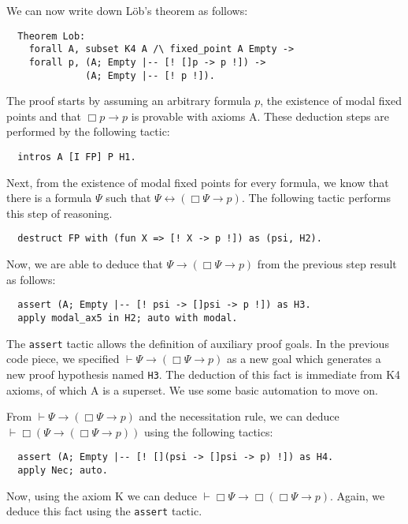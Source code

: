\documentclass[3p,times]{elsarticle}
\begin{document}
\noindent We can now write down L\"ob's theorem as follows:

\begin{verbatim}
  Theorem Lob:
    forall A, subset K4 A /\ fixed_point A Empty ->
    forall p, (A; Empty |-- [! []p -> p !]) ->
              (A; Empty |-- [! p !]).
\end{verbatim}

\noindent The proof starts by assuming an arbitrary formula $p$, the existence of modal fixed
points and that $\Box p \to p$ is provable with axioms A. These deduction steps
are performed by the following tactic:

\begin{verbatim}
  intros A [I FP] P H1.
\end{verbatim}

\noindent Next, from the existence of modal fixed points for every formula,
we know that there is a formula $\Psi$ such that $\Psi \leftrightarrow (\Box
\Psi \to p)$. The following tactic performs this step of reasoning.

\begin{verbatim}
  destruct FP with (fun X => [! X -> p !]) as (psi, H2).
\end{verbatim}

\noindent Now, we are able to deduce that $\Psi \to (\Box \Psi\to p)$ from the previous
step result as follows:

\begin{verbatim}
  assert (A; Empty |-- [! psi -> []psi -> p !]) as H3.
  apply modal_ax5 in H2; auto with modal.
\end{verbatim}

\noindent The \texttt{assert} tactic allows the definition of
auxiliary proof goals. In the previous code piece, we specified
$\vdash \Psi \to (\Box \Psi \to p)$ as a new goal which
generates a new proof hypothesis named \texttt{H3}. The
deduction of this fact is immediate from K4 axioms, of which A is a superset.
We use some basic automation to move on.

From $\vdash \Psi \to (\Box \Psi \to p)$ and the necessitation
rule, we can deduce $\vdash \Box (\Psi \to (\Box \Psi \to p))$
using the following tactics:
\begin{verbatim}
  assert (A; Empty |-- [! [](psi -> []psi -> p) !]) as H4.
  apply Nec; auto.
\end{verbatim}

\noindent Now, using the axiom K we can deduce $\vdash \Box \Psi \to
\Box (\Box \Psi \to p)$. Again, we deduce this fact using the
\texttt{assert} tactic.
\end{document}
